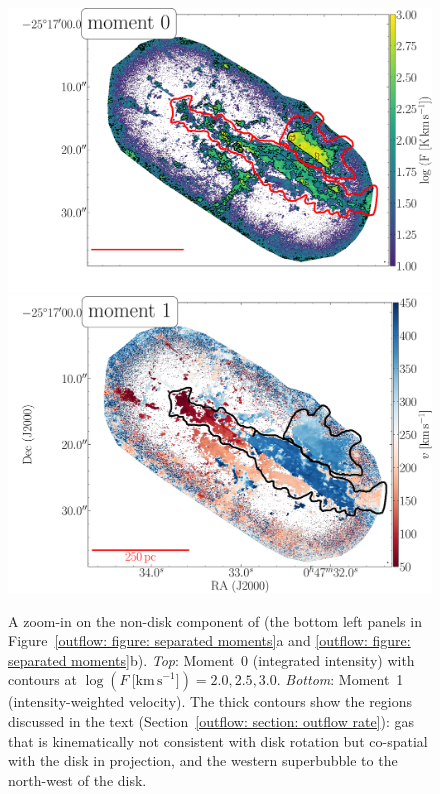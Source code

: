 \begin{figure}
    \centering
    \includegraphics[width=0.6\linewidth]{images/chapters/papers/outflow/outflow_fig7a.pdf}\\
    \includegraphics[width=0.6\linewidth]{images/chapters/papers/outflow/outflow_fig7b.pdf}
    \caption[Zoom-in on the non-disk  of Figure~\ref{outflow: figure: separated moments}]{A zoom-in on the non-disk component of  (the bottom left panels in Figure~\ref{outflow: figure: separated moments}a and \ref{outflow: figure: separated moments}b). \emph{Top}: Moment~0 (integrated intensity) with contours at $\log \left( F\ \lbrack \mathrm{km\,s}^{-1} \rbrack \right) = 2.0, 2.5, 3.0$. \emph{Bottom}: Moment~1 (intensity-weighted velocity). The thick contours show the regions discussed in the text (Section~\ref{outflow: section: outflow rate}): gas that is kinematically not consistent with disk rotation but co-spatial with the disk in projection, and the western superbubble to the north-west of the disk.}
    \label{outflow: figure: nondisk zoomin}
\end{figure}



